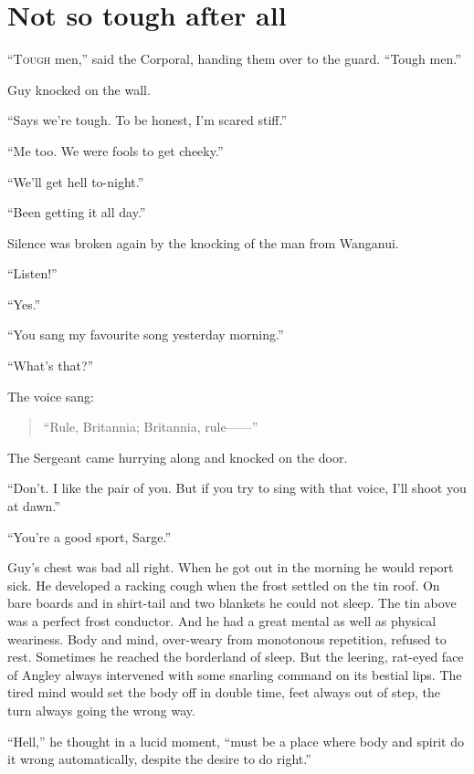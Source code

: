 \chapter*{\textsf{Not so tough after all}}

``T\textsc{ough} men,'' said the Corporal, handing them over to the guard. 
``Tough men.''

Guy knocked on the wall.

``Says we're tough. To be honest, I'm scared stiff.''

``Me too. We were fools to get cheeky.''

``We'll get hell to-night.''

``Been getting it all day.''

Silence was broken again by the knocking of the man from Wanganui.

``Listen!''

``Yes.''

``You sang my favourite song yesterday morning.''

``What's that?''

The voice sang:

\begin{verse}
``Rule, Britannia; Britannia, rule------''
\end{verse}

The Sergeant came hurrying along and knocked on the door.

``Don't. I like the pair of you. But if you try to sing with that 
voice, I'll shoot you at dawn.''

``You're a good sport, Sarge.''

Guy's chest was bad all right. When he got out in the morning he would 
report sick. He developed a racking cough when the frost settled on 
the tin roof. On bare boards and in shirt-tail and two blankets he 
could not sleep. The tin above was a perfect frost conductor. And 
he had a great mental as well as physical weariness. Body and mind, 
over-weary from monotonous repetition, refused to rest. Sometimes he 
reached the borderland of sleep. But the leering, rat-eyed face of 
Angley always intervened with some snarling command on its bestial 
lips. The tired mind would set the body off in double time, feet 
always out of step, the turn always going the wrong way.

``Hell,'' he thought in a lucid moment, ``must be a place where body 
and spirit do it wrong automatically, despite the desire to do right.''

